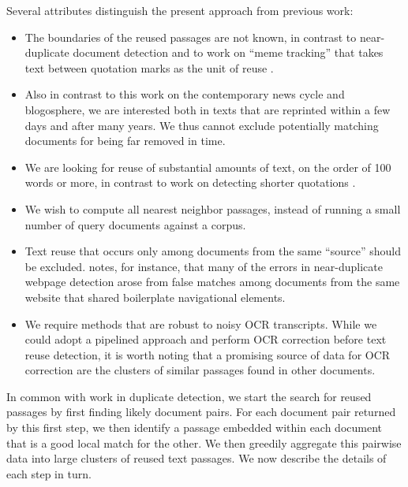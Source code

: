 \documentclass[pdftex,11pt]{article}
\begin{document}
Several attributes distinguish the present approach from previous
work:
\begin{itemize}

\item The boundaries of the reused passages are not known, in contrast
  to near-duplicate document detection and to work on ``meme
  tracking'' that takes text between quotation marks as the unit of
  reuse \cite{leskovec09:_meme_dynam_news_cycle,suen13:nifty}.

\item Also in contrast to this work on the contemporary news cycle and
  blogosphere, we are interested both in texts that are reprinted
  within a few days and after many years.  We thus cannot exclude
  potentially matching documents for being far removed in time.

\item We are looking for reuse of substantial amounts of text, on the
  order of 100 words or more, in contrast to work on detecting shorter
  quotations
  \cite{kolak08:_gener_links_minin_quotat,seo08:_local_text_reuse_detec,horton10:_somet_borrow,lease12:_findin_explor_memes_social_media}.

\item We wish to compute all nearest neighbor passages, instead of
  running a small number of query documents against a corpus.

\item Text reuse that occurs only among documents from the same
  ``source'' should be excluded.
  \citet{henzinger06:_findin_near_duplic_web_pages} notes, for
  instance, that many of the errors in near-duplicate webpage
  detection arose from false matches among documents from the same
  website that shared boilerplate navigational elements.

\item We require methods that are robust to noisy OCR transcripts.
  While we could adopt a pipelined approach and perform OCR correction
  before text reuse detection, it is worth noting that a promising
  source of data for OCR correction are the clusters of similar
  passages found in other documents.

\end{itemize}

In common with work in duplicate detection, we start the search for
reused passages by first finding likely document pairs.  For each
document pair returned by this first step, we then identify a passage
embedded within each document that is a good local match for the
other.  We then greedily aggregate this pairwise data into large
clusters of reused text passages.  We now describe the details of each
step in turn.
\end{document}
